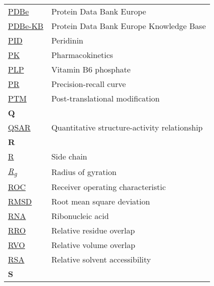 \begin{longtable}[l]{@{}p{2.5cm}p{12cm}@{}}
\textmd{\href{https://www.ebi.ac.uk/pdbe/}{PDBe}} & Protein Data Bank Europe \\
\textmd{\href{https://www.ebi.ac.uk/pdbe/pdbe-kb/}{PDBe-KB}} & Protein Data Bank Europe Knowledge Base \\
\textmd{\href{https://www.ebi.ac.uk/pdbe-srv/pdbechem/chemicalCompound/show/PID}{PID}} & Peridinin \\
\textmd{\href{https://en.wikipedia.org/wiki/Pharmacokinetics}{PK}} & Pharmacokinetics \\
\textmd{\href{https://www.ebi.ac.uk/pdbe-srv/pdbechem/chemicalCompound/show/PLP}{PLP}} & Vitamin B6 phosphate \\
\textmd{\href{https://en.wikipedia.org/wiki/Precision_and_recall}{PR}} & Precision-recall curve \\
\textmd{\href{https://en.wikipedia.org/wiki/Post-translational_modification}{PTM}} & Post-translational modification \\[0.3175cm]
\textbf{\large Q} & \\[0.25cm]
\textmd{\href{https://en.wikipedia.org/wiki/Quantitative_structure–activity_relationship}{QSAR}} & Quantitative structure-activity relationship \\[0.3175cm]
\textbf{\large R} & \\[0.25cm]
\textmd{\href{https://en.wikipedia.org/wiki/Amino_acid\#Side_chains}{R}} & Side chain \\
\textmd{\href{https://en.wikipedia.org/wiki/Radius_of_gyration}{\textit{R\textsubscript{g}}}} & Radius of gyration \\
\textmd{\href{https://en.wikipedia.org/wiki/Receiver_operating_characteristic}{ROC}} & Receiver operating characteristic \\
\textmd{\href{https://en.wikipedia.org/wiki/Root_mean_square_deviation}{RMSD}} & Root mean square deviation \\
\textmd{\href{https://en.wikipedia.org/wiki/RNA}{RNA}} & Ribonucleic acid \\
\textmd{\href{https://jcheminf.biomedcentral.com/articles/10.1186/s13321-024-00923-z}{RRO}} & Relative residue overlap \\
\textmd{\href{https://jcheminf.biomedcentral.com/articles/10.1186/s13321-024-00923-z}{RVO}} & Relative volume overlap \\
\textmd{\href{https://en.wikipedia.org/wiki/Relative_accessible_surface_area}{RSA}} & Relative solvent accessibility \\[0.3175cm]
\textbf{\large S} & \\[0.25cm]

\end{longtable}
